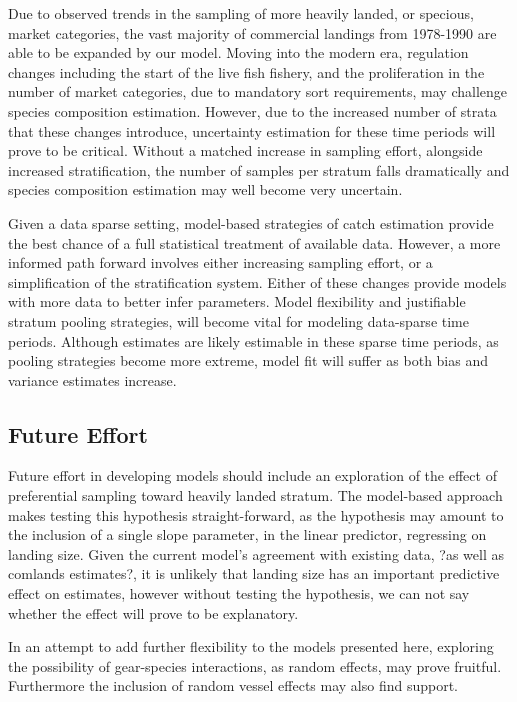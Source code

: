 \documentclass[12pt]{article}
\begin{document}
Due to observed trends in the sampling of more heavily landed, or
specious, market categories, the vast majority of commercial landings
from 1978-1990 are able to be expanded by our model. Moving into the
modern era, regulation changes including the start of the live fish
fishery, and the proliferation in the number of market categories, due
to mandatory sort requirements, may challenge species composition
estimation. However, due to the increased number of strata that these
changes introduce, uncertainty estimation for these time periods will
prove to be critical. Without a matched increase in sampling effort,
alongside increased stratification, the number of samples per stratum
falls dramatically and species composition estimation may well become
very uncertain.

Given a data sparse setting, model-based strategies of catch estimation
provide the best chance of a full statistical treatment of available
data. However, a more informed path forward involves either increasing
sampling effort, or a simplification of the stratification system.
Either of these changes provide models with more data to better infer
parameters. Model flexibility and justifiable stratum pooling
strategies, will become vital for modeling data-sparse time periods.
Although estimates are likely estimable in these sparse time periods, as
pooling strategies become more extreme, model fit will suffer as both
bias and variance estimates increase.

\subsection{Future Effort}\label{future-effort}

Future effort in developing models should include an exploration of the
effect of preferential sampling toward heavily landed stratum. The
model-based approach makes testing this hypothesis straight-forward, as
the hypothesis may amount to the inclusion of a single slope parameter,
in the linear predictor, regressing on landing size. Given the current
model's agreement with existing data, ?as well as comlands estimates?,
it is unlikely that landing size has an important predictive effect on
estimates, however without testing the hypothesis, we can not say
whether the effect will prove to be explanatory.

In an attempt to add further flexibility to the models presented here,
exploring the possibility of gear-species interactions, as random
effects, may prove fruitful. Furthermore the inclusion of random vessel
effects may also find support.
\end{document}
